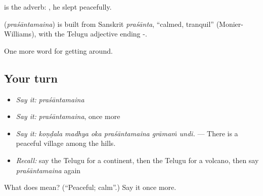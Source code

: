  is the adverb:  , he slept peacefully.

\begin{cousinweb}
\textbf{} (\emph{praśāntamaina}) is built from Sanskrit \emph{praśānta}, \textquotedblleft{}calmed, tranquil\textquotedblright{} (Monier-Williams), with the Telugu adjective ending -.
\end{cousinweb}

\begin{grammarlens}[title={What you've built}]
One more word for getting around.
\end{grammarlens}

\subsection*{Your turn}
\begin{itemize}
\raggedright
  \item \emph{Say it:} \emph{praśāntamaina}
  \item \emph{Say it:} \emph{praśāntamaina}, once more
  \item \emph{Say it:} \emph{koṇḍala madhya oka praśāntamaina grāmaṁ undi.} — There is a peaceful village among the hills.
  \item \emph{Recall:} say the Telugu for a continent, then the Telugu for a volcano, then say \emph{praśāntamaina} again
\end{itemize}

\begin{tcolorbox}[breakable,colback=teal!4,colframe=teal!35!black,title={Before you move on}]
What does  mean? (\textquotedblleft{}Peaceful; calm\textquotedblright{}.) Say it once more.
\end{tcolorbox}
